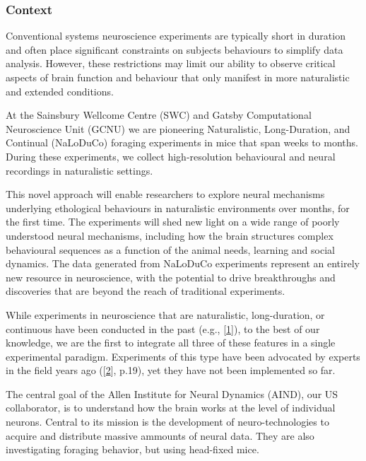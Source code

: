 \subsubsection{Context}

Conventional systems neuroscience experiments are typically short in duration
and often place significant constraints on subjects behaviours to simplify data
analysis.
%
However, these restrictions may limit our ability to observe critical
aspects of brain function and behaviour that only manifest in more naturalistic
and extended conditions.

At the Sainsbury Wellcome Centre (SWC) and Gatsby Computational Neuroscience
Unit (GCNU) we are pioneering Naturalistic, Long-Duration, and Continual
(NaLoDuCo) foraging experiments in mice that span weeks to months. During these
experiments, we collect high-resolution behavioural and neural recordings in
naturalistic settings.

This novel  approach will enable researchers to explore neural mechanisms
underlying ethological behaviours in naturalistic environments over months, for
the first time.  The experiments will shed new light on a wide range of poorly
understood neural mechanisms, including how the brain structures complex
behavioural sequences as a function of the animal needs, learning and social
dynamics.
%
The data generated from NaLoDuCo experiments represent an entirely new resource
in neuroscience, with the potential to drive breakthroughs and discoveries that
are beyond the reach of traditional experiments.

While experiments in neuroscience that are naturalistic, long-duration, or
continuous have been conducted in the past (e.g.,
[\href{https://pubmed.ncbi.nlm.nih.gov/37656619/}{1}]), to the best of our
knowledge, we are the first to integrate all three of these features in a
single experimental paradigm.
%
Experiments of this type have been advocated by experts in the field years ago
([\href{https://pubmed.ncbi.nlm.nih.gov/31600508/}{2}], p.19), yet they have
not been implemented so far.

The central goal of the Allen Institute for Neural Dynamics (AIND), our US
collaborator, is to understand how the brain works at the level of individual
neurons.
%
Central to its mission is the development of neuro-technologies to acquire and
distribute massive ammounts of neural data.
%
They are also investigating foraging behavior, but using head-fixed mice.


